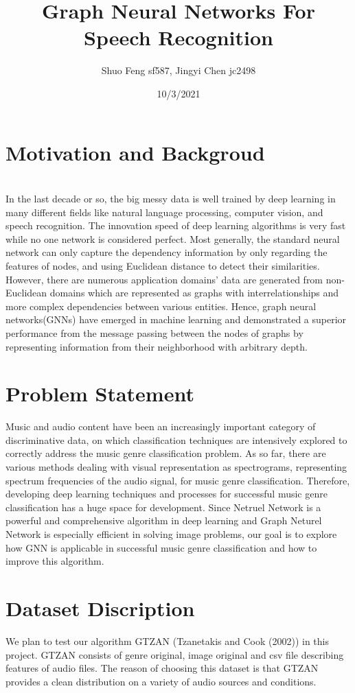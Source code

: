 \documentclass{article}
\title{Graph Neural Networks For Speech Recognition}
\author{Shuo Feng sf587, Jingyi Chen jc2498}
\date{10/3/2021}
\begin{document}
\maketitle


\section{Motivation and Backgroud}
\\
In the last decade or so, the big messy data is well trained by deep learning in many different fields like natural language processing, computer vision, and speech recognition. The innovation speed of deep learning algorithms is very fast while no one network is considered perfect. Most generally, the standard neural network can only capture the dependency information by only regarding the features of nodes, and using Euclidean distance to detect their similarities. However, there are numerous application domains’ data are generated from non-Euclidean domains which are represented as graphs with interrelationships and more complex dependencies between various entities. Hence, graph neural networks(GNNs) have emerged in machine learning and demonstrated a superior performance from the message passing between the nodes of graphs by representing information from their neighborhood with arbitrary depth.\\

\section{Problem Statement}
Music and audio content have been an increasingly important category of discriminative data, on which classification techniques are intensively explored to correctly address the music genre classification problem. As so far, there are various methods dealing with visual representation as spectrograms, representing spectrum frequencies of the audio signal, for music genre classification. Therefore, developing deep learning techniques and processes for successful music genre classification has a huge space for development. Since Netruel Network is a powerful and comprehensive algorithm in deep learning and Graph Neturel Network is especially efficient in solving image problems,  our goal is to explore how GNN is applicable in successful music genre classification and how to improve this algorithm. 

\section{Dataset Discription}
We plan to test our algorithm GTZAN (Tzanetakis and Cook (2002)) in this project. GTZAN consists of genre original, image original and csv file describing features of audio files. The reason of choosing this dataset is that GTZAN provides a clean distribution on a variety of audio sources and conditions.
\end{document}
